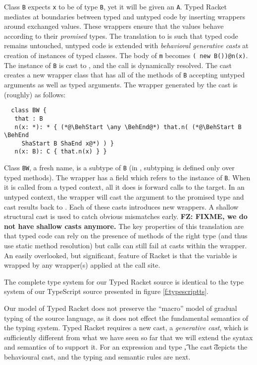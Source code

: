 \documentclass[acmlarge, anonymous, authordraft]{acmart}
\newcommand{\code}[1]{{\tt #1}\xspace}
\newcommand{\FZ}[1]{\textbf{FZ: #1}}
\begin{document}
\noindent Class \code B expects \code x to be of type \code B, yet it will
be given an \code A. Typed Racket mediates at boundaries between typed and
untyped code by inserting wrappers around exchanged values. These wrappers
ensure that the values behave according to their \emph{promised} types. The
translation to \kafka is such that typed code remains untouched, untyped
code is extended with \emph{behavioral generative casts} at creation of
instances of typed classes. The body of \code m becomes {\tt ({\BehStart
    \any \BehEnd}new B())@n(x)}.  The instance of \code B is cast to \any,
and the call is dynamically resolved. The cast creates a new wrapper class
that has all of the methods of \code B accepting untyped arguments as well
as typed arguments. The wrapper generated by the cast is (roughly) as
follows:

\begin{lstlisting}
  class BW {
   that : B
   n(x: *): * { (*@\BehStart \any \BehEnd@*) that.n( (*@\BehStart B \BehEnd
     ShaStart B ShaEnd x@*) ) }
   n(x: B): C { that.n(x) } }
\end{lstlisting}

\noindent Class \code{BW}, a fresh name, is a subtype of
\code B (in \kafka, subtyping is defined only over typed methods).  The
wrapper has a field \that which refers to the instance of \code B. When it
is called from a typed context, all it does is forward calls to the
target. In an untyped context, the wrapper will cast the argument to the
promised type and cast results back to \any. Each of these casts introduces
new wrappers. A shallow structural cast is used to catch obvious mismatches
early.   \FZ{FIXME, we do not have shallow casts anymore.}
 The key properties of this translation are that typed code can rely
on the presence of methods of the right type (and thus use static method
resolution) but calls can still fail at casts within the wrapper. An easily
overlooked, but significant, feature of Racket is that the \this variable is
wrapped by any wrapper(s) applied at the call site.

The complete type system for our Typed Racket source is identical to the type
system of our TypeScript source presented in figure \ref{f:typescriptts}.

Our model of Typed Racket does not preserve the ``macro'' model of gradual
typing of the source language, as it does not effect the fundamental
semantics of the typing system.  Typed Racket requires a new cast, a
\emph{generative cast}, which is sufficiently different from what we have
seen so far that we will extend the syntax and semantics of \kafka to
support it.  For an expression \e and type \t, the cast \BehCast\t\e depicts
the behavioural cast, and the typing and semantic rules are next.
\end{document}
